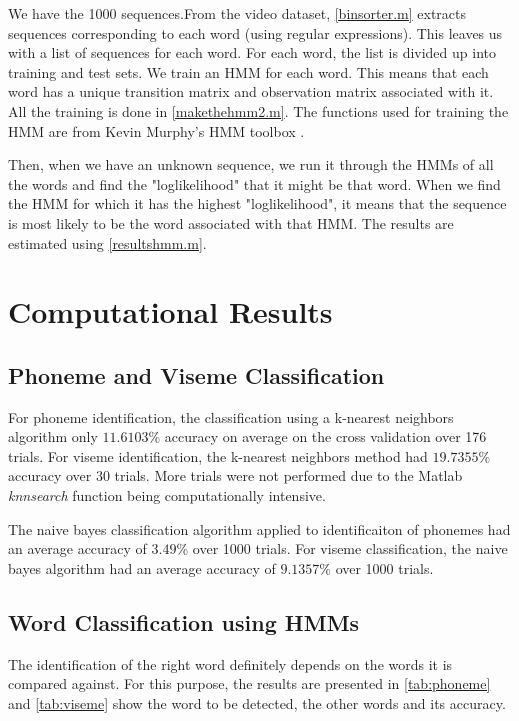 \documentclass[a4paper]{article}
\begin{document}
We have the 1000 sequences.From the video dataset, \ref{binsorter.m} extracts sequences corresponding to each word (using regular expressions).
This leaves us with a list of sequences for each word. For each word, the list is divided up into training and test sets. We train an HMM for each word. This means that each word has a unique transition matrix and observation matrix associated with it. All the training is done in \ref{makethehmm2.m}. The functions used for training the HMM are from Kevin Murphy's HMM toolbox \cite{key-9}.

Then, when we have an unknown sequence, we run it through the HMMs of all the words and find the "loglikelihood" that it might be that word. When we find the HMM for which it has the highest "loglikelihood", it means that the sequence is most likely to be the word associated with that HMM. The results are estimated using \ref{resultshmm.m}.

\section{Computational Results}

\subsection{ Phoneme and Viseme Classification}
For phoneme identification, the classification using a k-nearest neighbors algorithm only $11.6103\%$ accuracy on average on the cross validation over 176 trials.  For viseme identification, the k-nearest neighbors method had $19.7355\%$ accuracy over 30 trials.  More trials were not performed due to the Matlab {\it knnsearch} function being computationally intensive.  

The naive bayes classification algorithm applied to identificaiton of phonemes had an average accuracy of $3.49\%$ over 1000 trials.  For viseme classification, the naive bayes algorithm had an average accuracy of $9.1357\%$ over 1000 trials. 

\subsection{Word Classification using HMMs}

The identification of the right word definitely depends on the words it is compared against. For this purpose, the results are presented in \ref{tab:phoneme} and \ref{tab:viseme} show the word to be detected, the other words and its accuracy.
\end{document}
